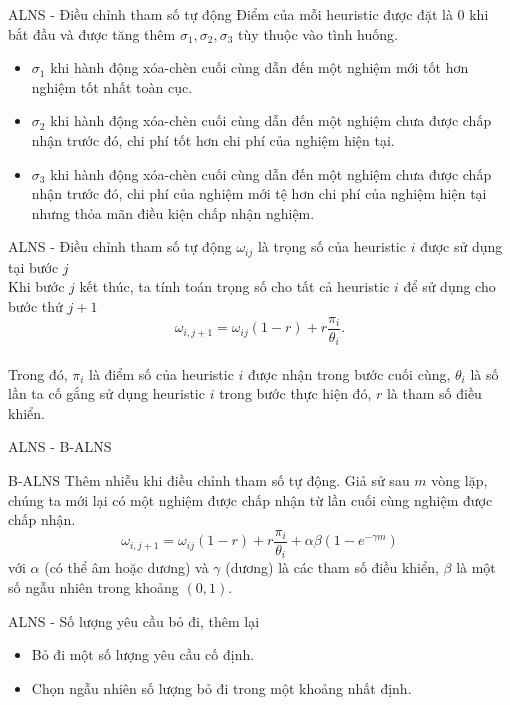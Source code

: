 \begin{frame}{ALNS - Điều chỉnh tham số tự động}
  Điểm của mỗi heuristic được đặt là $0$ khi bắt đầu và được tăng thêm $\sigma_1, \sigma_2, \sigma_3$ tùy thuộc vào tình huống.
  \begin{itemize}
    \justifying
    \item $\sigma_1$ khi hành động xóa-chèn cuối cùng dẫn đến một nghiệm mới tốt hơn nghiệm tốt nhất toàn cục.
    \item $\sigma_2$ khi hành động xóa-chèn cuối cùng dẫn đến một nghiệm chưa được chấp nhận trước đó, chi phí tốt hơn chi phí của nghiệm hiện tại.
    \item $\sigma_3$ khi hành động xóa-chèn cuối cùng dẫn đến một nghiệm chưa được chấp nhận trước đó, chi phí của nghiệm mới tệ hơn chi phí của nghiệm hiện tại nhưng thỏa mãn điều kiện chấp nhận nghiệm.
  \end{itemize}
\end{frame}

\begin{frame}{ALNS - Điều chỉnh tham số tự động}
  $\omega_{ij}$ là trọng số của heuristic $i$ được sử dụng tại bước $j$ \\
  Khi bước $j$ kết thúc, ta tính toán trọng số cho tất cả heuristic $i$ để sử dụng cho bước thứ $j + 1$
  \begin{equation}
      \omega_{i, j+1} = \omega_{ij}(1-r)+r\frac{\pi_i}{\theta_i}.
  \end{equation} \\
  Trong đó, $\pi_i$ là điểm số của heuristic $i$ được nhận trong bước cuối cùng, $\theta_i$ là số lần ta cố gắng sử dụng heuristic $i$ trong bước thực hiện đó, $r$ là tham số điều khiển.
\end{frame}

\begin{frame}{ALNS - B-ALNS}
  \begin{block}{B-ALNS}
    Thêm nhiễu khi điều chỉnh tham số tự động. Giả sử sau $m$ vòng lặp, chúng ta mới lại có một nghiệm được chấp nhận từ lần cuối cùng nghiệm được chấp nhận.
    \begin{equation}
      \label{eq:boost_adaptive_weight}
      \omega_{i, j+1} = \omega_{ij}(1-r)+r\frac{\pi_i} {\theta_i} + \alpha \beta (1 - e^{-\gamma m})
    \end{equation}
    với $\alpha$ (có thể âm hoặc dương) và $\gamma$ (dương) là các tham số điều khiển, $\beta$ là một số ngẫu nhiên trong khoảng $(0,1)$.
  \end{block}
\end{frame}

\begin{frame}{ALNS - Số lượng yêu cầu bỏ đi, thêm lại}
  \begin{itemize}
    \item Bỏ đi một số lượng yêu cầu cố định. 
    \item Chọn ngẫu nhiên số lượng bỏ đi trong một khoảng nhất định.
  \end{itemize}
\end{frame}

